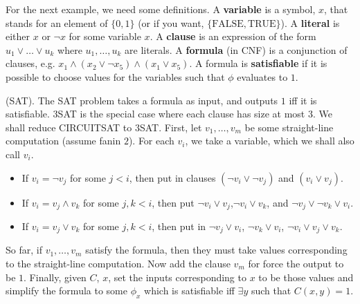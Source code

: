 \documentclass{article}
\begin{document}
For the next example, we need some definitions. A \textbf{variable} is a symbol, $x$, that stands for an element of $\{0,1\}$ (or if you want, $\{\text{FALSE},\text{TRUE}\}$). A \textbf{literal} is either $x$ or $\neg x$ for some variable $x$. A \textbf{clause} is an expression of the form $u_{1} \vee \dots \vee u_{k}$ where $u_{1},\dots,u_{k}$ are literals. A \textbf{formula} (in CNF) is a conjunction of clauses, e.g. $x_{1} \wedge (x_{2} \vee \neg x_{5}) \wedge (x_{1} \vee x_{5})$. A formula is \textbf{satisfiable} if it is possible to choose values for the variables such that $\phi$ evaluates to $1$.
\begin{ex*}
    (SAT). The SAT problem takes a formula as input, and outputs $1$ iff it is satisfiable. 3SAT is the special case where each clause has size at most $3$. We shall reduce CIRCUITSAT to 3SAT. First, let $v_{1},\dots,v_{m}$ be some straight-line computation (assume fanin $2$). For each $v_{i}$, we take a variable, which we shall also call $v_{i}$.\begin{itemize} 
        \item If $v_{i} = \neg v_{j}$ for some $j < i$, then put in clauses $(\neg v_{i} \vee \neg v_{j})$ and $(v_{i} \vee v_{j})$. 
        \item If $v_{i}=v_{j} \wedge v_{k}$ for some $j,k<i$, then put $\neg v_{i} \vee v_{j}$,$\neg v_{i} \vee v_{k}$, and $\neg v_{j} \vee \neg v_{k} \vee v_{i}$.
        \item If $v_{i} = v_{j} \vee v_{k}$ for some $j,k<i$, then put in $\neg v_{j} \vee v_{i}$, $\neg v_{k} \vee v_{i}$, $\neg v_{i} \vee v_{j} \vee v_{k}$.
    \end{itemize}
    So far, if $v_{1},\dots,v_{m}$ satisfy the formula, then they must take values corresponding to the straight-line computation. Now add the clause $v_{m}$ for force the output to be $1$. Finally, given $C$, $x$, set the inputs corresponding to $x$ to be those values and simplify the formula to some $\phi_{x}$ which is satisfiable iff $\exists y$ such that $C(x,y)=1$.
\end{ex*}
\newlec 
\end{document}
